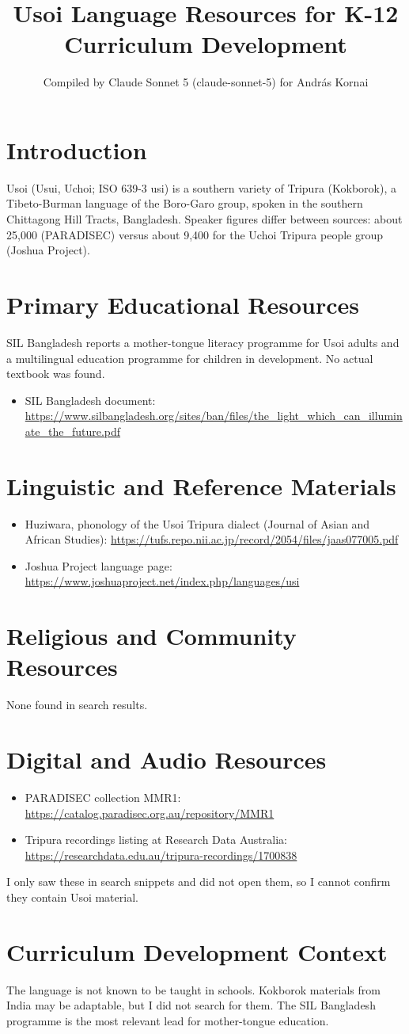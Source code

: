 \documentclass[12pt]{article}
\title{Usoi Language Resources for K-12 Curriculum Development}
\author{Compiled by Claude Sonnet 5 (claude-sonnet-5) for Andr\'as Kornai}
\date{}
\begin{document}
\maketitle
\section{Introduction}
Usoi (Usui, Uchoi; ISO 639-3 usi) is a southern variety of Tripura (Kokborok), a Tibeto-Burman language of the Boro-Garo group, spoken in the southern Chittagong Hill Tracts, Bangladesh. Speaker figures differ between sources: about 25,000 (PARADISEC) versus about 9,400 for the Uchoi Tripura people group (Joshua Project).
\section{Primary Educational Resources}
SIL Bangladesh reports a mother-tongue literacy programme for Usoi adults and a multilingual education programme for children in development. No actual textbook was found.
\begin{itemize}
\item SIL Bangladesh document: \url{https://www.silbangladesh.org/sites/ban/files/the_light_which_can_illuminate_the_future.pdf}
\end{itemize}
\section{Linguistic and Reference Materials}
\begin{itemize}
\item Huziwara, phonology of the Usoi Tripura dialect (Journal of Asian and African Studies): \url{https://tufs.repo.nii.ac.jp/record/2054/files/jaas077005.pdf}
\item Joshua Project language page: \url{https://www.joshuaproject.net/index.php/languages/usi}
\end{itemize}
\section{Religious and Community Resources}
None found in search results.
\section{Digital and Audio Resources}
\begin{itemize}
\item PARADISEC collection MMR1: \url{https://catalog.paradisec.org.au/repository/MMR1}
\item Tripura recordings listing at Research Data Australia: \url{https://researchdata.edu.au/tripura-recordings/1700838}
\end{itemize}
I only saw these in search snippets and did not open them, so I cannot confirm they contain Usoi material.
\section{Curriculum Development Context}
The language is not known to be taught in schools. Kokborok materials from India may be adaptable, but I did not search for them. The SIL Bangladesh programme is the most relevant lead for mother-tongue education.
\end{document}
